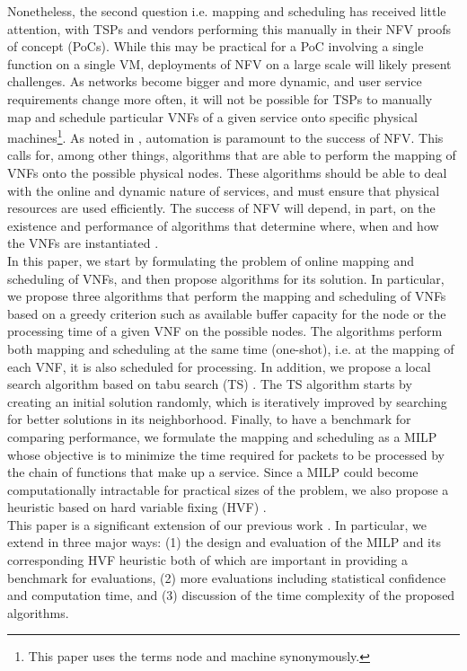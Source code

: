 \documentclass[conference]{IEEEtran}
\begin{document}
\indent Nonetheless, the second question i.e. mapping and scheduling has received little attention, with \acp{TSP} and vendors performing this manually in their \ac{NFV} proofs of concept (PoCs). While this may be practical for a PoC involving a single function on a single \ac{VM}, deployments of \ac{NFV} on a large scale will likely present challenges. As networks become bigger and more dynamic, and user service requirements change more often, it will not be possible for \acp{TSP} to manually map and schedule particular VNFs of a given service onto specific physical machines\footnote{This paper uses the terms node and machine synonymously.}. As noted in \cite{Guerzoni12}, automation is paramount to the success of \ac{NFV}. This calls for, among other things, algorithms that are able to perform the mapping of \acp{VNF} onto the possible physical nodes. These algorithms should be able to deal with the online and dynamic nature of services, and must ensure that physical resources are used efficiently. The success of NFV will depend, in part, on the existence and performance of algorithms that determine where, when and how the \acp{VNF} are instantiated \cite{pap}.\\
\indent In this paper, we start by formulating the problem of online mapping and scheduling of VNFs, and then propose algorithms for its solution. In particular, we propose three algorithms that perform the mapping and scheduling of VNFs based on a greedy criterion such as available buffer capacity for the node or the processing time of a given VNF on the possible nodes. The algorithms perform both mapping and scheduling at the same time (one-shot), i.e. at the mapping of each VNF, it is also scheduled for processing. In addition, we propose a local search algorithm based on tabu search (TS) \cite{GloverTS}. The TS algorithm starts by creating an initial solution randomly, which is iteratively improved by searching for better solutions in its neighborhood. Finally, to have a benchmark for comparing performance, we formulate the mapping and scheduling as a \ac{MILP} whose objective is to minimize the time required for packets to be processed by the chain of functions that make up a service. Since a \ac{MILP} could become computationally intractable for practical sizes of the problem, we also propose a heuristic based on hard variable fixing (HVF) \cite{hvfpp}.\\
\indent This paper is a significant extension of our previous work \cite{MijumbiNFV15}. In particular, we extend \cite{MijumbiNFV15} in three major ways: (1) the design and evaluation of the \ac{MILP} and its corresponding HVF heuristic both of which are important in providing a benchmark for evaluations, (2) more evaluations including statistical confidence and computation time, and (3) discussion of the time complexity of the proposed algorithms.\\
\end{document}
